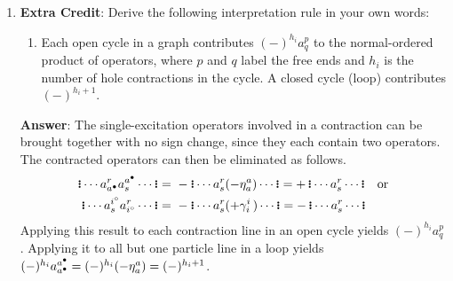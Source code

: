 \documentclass[11pt]{article}
\begin{document}
\begin{enumerate}
\newpage
\item[]
  \textbf{Extra Credit}:
  Derive the following interpretation rule in your own words:
  \begin{enumerate}
  \item[]
    Each open cycle in a graph contributes $(-)^{h_i}a^p_q$ to the normal-ordered product of operators, where $p$ and $q$ label the free ends and $h_i$ is the number of hole contractions in the cycle.
  A closed cycle (loop) contributes $(-)^{h_i+1}$.
  \end{enumerate}
\vspace{10pt}
\textbf{Answer}:
The single-excitation operators involved in a contraction can be brought together with no sign change, since they each contain two operators.
The contracted operators can then be eliminated as follows.
\begin{align*}
  \gno{
  \cd
    a^r_{a^\ptcl}
    a^{a^\ptcl}_s
  \cd
  }
=&\
-
  \gno{
  \cd
    a^r_s
    (-\h_a^a)
  \cd
  }
=
+\,
  \gno{
  \cd
    a^r_s
  \cd
  }
\hspace{10pt}
  \text{or}
\\
  \gno{
  \cd
    a^{i^\hole}_s
    a^r_{i^\hole}
  \cd
  }
=&\
-
  \gno{
  \cd
    a^r_s
    (+\g_i^i\,)
  \cd
  }
=
-\,
  \gno{
  \cd
    a^r_s
  \cd
  }
\end{align*}
Applying this result to each contraction line in an open cycle yields
$(-)^{h_i}a^p_q$.
Applying it to all but one particle line in a loop yields
$
  (-)^{h_i}a^{a^\bullet}_{a^\bullet}
=
  (-)^{h_i}(-\eta ^a_a)
=
  (-)^{h_i + 1}
$.
\end{enumerate}
\end{document}

